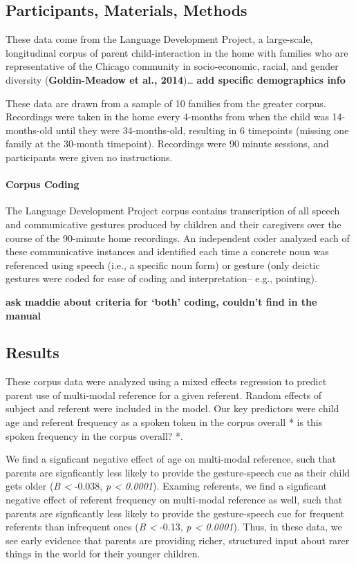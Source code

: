 \documentclass[10pt, letterpaper]{article}
\begin{document}
\subsection{Participants, Materials,
Methods}\label{participants-materials-methods}

These data come from the Language Development Project, a large-scale,
longitudinal corpus of parent child-interaction in the home with
families who are representative of the Chicago community in
socio-economic, racial, and gender diversity (\textbf{Goldin-Meadow et
al., 2014})\ldots{} \textbf{add specific demographics info}

These data are drawn from a sample of 10 families from the greater
corpus. Recordings were taken in the home every 4-months from when the
child was 14-months-old until they were 34-months-old, resulting in 6
timepoints (missing one family at the 30-month timepoint). Recordings
were 90 minute sessions, and participants were given no instructions.

\paragraph{Corpus Coding}\label{corpus-coding}

The Language Development Project corpus contains transcription of all
speech and communicative gestures produced by children and their
caregivers over the course of the 90-minute home recordings. An
independent coder analyzed each of these communicative instances and
identified each time a concrete noun was referenced using speech (i.e.,
a specific noun form) or gesture (only deictic gestures were coded for
ease of coding and interpretation-- e.g., pointing).

\textbf{ask maddie about criteria for `both' coding, couldn't find in
the manual}

\subsection{Results}\label{results}

These corpus data were analyzed using a mixed effects regression to
predict parent use of multi-modal reference for a given referent. Random
effects of subject and referent were included in the model. Our key
predictors were child age and referent frequency as a spoken token in
the corpus overall * is this spoken frequency in the corpus overall? *.

We find a signficant negative effect of age on multi-modal reference,
such that parents are signficantly less likely to provide the
gesture-speech cue as their child gets older (\emph{B \textless{}}
-0.038, \emph{p \textless{} 0.0001}). Examing referents, we find a
signficant negative effect of referent frequency on multi-modal
reference as well, such that parents are signficantly less likely to
provide the gesture-speech cue for frequent referents than infrequent
ones (\emph{B \textless{}} -0.13, \emph{p \textless{} 0.0001}). Thus, in
these data, we see early evidence that parents are providing richer,
structured input about rarer things in the world for their younger
children.
\end{document}
